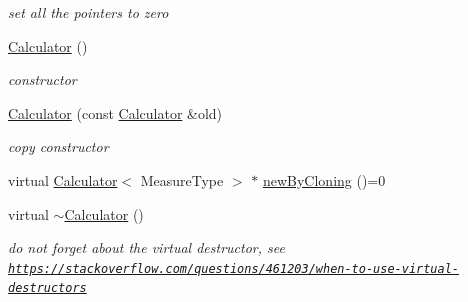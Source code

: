 \begin{DoxyCompactItemize}
\begin{DoxyCompactList}\small\item\em set all the pointers to zero \end{DoxyCompactList}\item 
\hypertarget{class_ox_1_1_calculator_a4a3762f0c260cb0e34f72e40a7329d27}{\hyperlink{class_ox_1_1_calculator_a4a3762f0c260cb0e34f72e40a7329d27}{Calculator} ()}\label{class_ox_1_1_calculator_a4a3762f0c260cb0e34f72e40a7329d27}

\begin{DoxyCompactList}\small\item\em constructor \end{DoxyCompactList}\item 
\hypertarget{class_ox_1_1_calculator_a600434abcaff13ac70d0d4b06b9df583}{\hyperlink{class_ox_1_1_calculator_a600434abcaff13ac70d0d4b06b9df583}{Calculator} (const \hyperlink{class_ox_1_1_calculator}{Calculator} \&old)}\label{class_ox_1_1_calculator_a600434abcaff13ac70d0d4b06b9df583}

\begin{DoxyCompactList}\small\item\em copy constructor \end{DoxyCompactList}\item 
virtual \hyperlink{class_ox_1_1_calculator}{Calculator}$<$ Measure\-Type $>$ $\ast$ \hyperlink{class_ox_1_1_calculator_aaec48f39f9b0ea1b622485cf25fba484}{new\-By\-Cloning} ()=0
\item 
\hypertarget{class_ox_1_1_calculator_a0e0d0f525a80e54f17ab14e4073d780d}{virtual \hyperlink{class_ox_1_1_calculator_a0e0d0f525a80e54f17ab14e4073d780d}{$\sim$\-Calculator} ()}\label{class_ox_1_1_calculator_a0e0d0f525a80e54f17ab14e4073d780d}

\begin{DoxyCompactList}\small\item\em do not forget about the virtual destructor, see \href{https://stackoverflow.com/questions/461203/when-to-use-virtual-destructors}{\tt https\-://stackoverflow.\-com/questions/461203/when-\/to-\/use-\/virtual-\/destructors} \end{DoxyCompactList}\end{DoxyCompactItemize}
